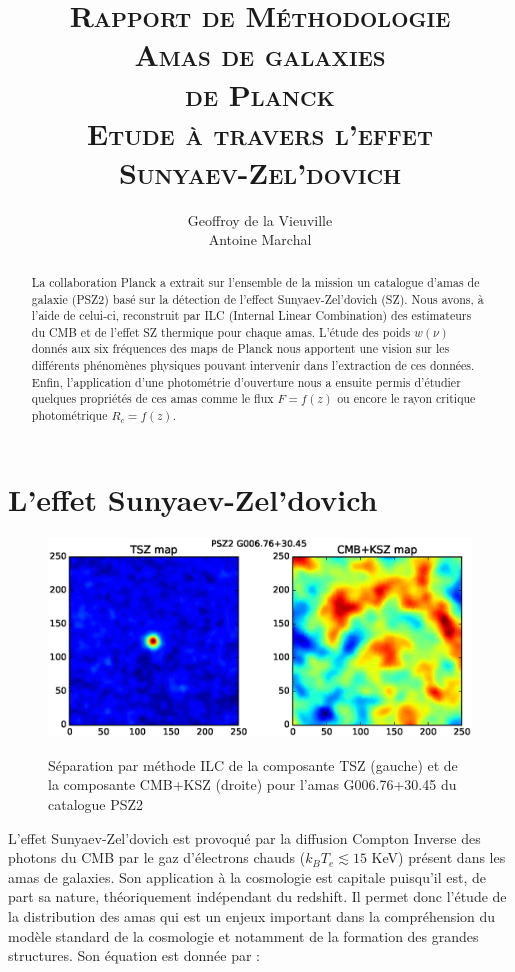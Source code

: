 \documentclass[a4paper,11pt]{article}
\title{{\textsc{\Large{Rapport de Méthodologie}\\ [3cm]
      \textbf{\LARGE{Amas de galaxies \\ de Planck}} \\ [0.6cm] 
Etude à travers l'effet \\ Sunyaev-Zel’dovich}} \\[2cm]}
\author{Geoffroy de la Vieuville \\ Antoine Marchal}
\date{}
\begin{document}
\begin{titlingpage}
\maketitle
\begin{abstract}
  La collaboration Planck a extrait sur l'ensemble de la mission un
  catalogue d'amas de galaxie (PSZ2) basé sur la détection de l'effect
  Sunyaev-Zel’dovich (SZ). Nous avons, à l'aide de celui-ci,
  reconstruit par ILC (Internal Linear Combination) des estimateurs du
  CMB et de l'effet SZ thermique pour chaque amas. 
  L'étude des poids $w(\nu)$ donnés aux six fréquences des 
  maps de Planck nous apportent une vision sur les différents
  phénomènes physiques pouvant intervenir dans l'extraction de ces données. Enfin,
  l'application d'une photométrie d'ouverture nous a ensuite permis 
  d'étudier quelques propriétés de ces amas comme le flux $F=f(z)$ 
  ou encore le rayon critique photométrique $R_{c}=f(z)$.
\end{abstract}
\end{titlingpage}

\newpage

\section{L'effet Sunyaev-Zel’dovich}

\begin{figure}[b!]
  \centering
  \includegraphics[width=4.5in]{sz_effect.eps}
  \label{sz_effect}
  \caption{Séparation par méthode ILC de la composante TSZ (gauche) et de la
    composante CMB+KSZ (droite) pour l'amas G006.76+30.45 du catalogue
  PSZ2}
\end{figure}

L'effet Sunyaev-Zel’dovich \cite{Sunyaev} est provoqué par la diffusion Compton
Inverse des photons du CMB par le gaz d'électrons chauds ($k_B T_e
\lesssim 15$ KeV) présent dans les amas de galaxies. Son application à
la cosmologie est capitale puisqu'il est, de part sa nature, 
théoriquement indépendant du redshift. Il permet donc l'étude de la
distribution des amas qui est un enjeux important dans la
compréhension du modèle standard de la cosmologie et notamment de la
formation des grandes structures. Son équation est donnée par : 
\end{document}
